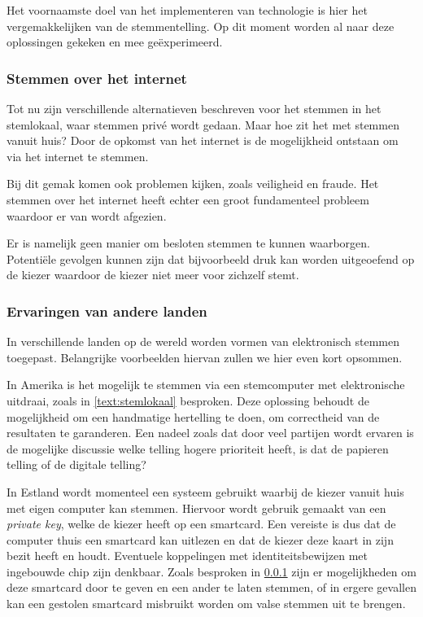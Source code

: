 \documentclass[a4paper]{article}
\begin{document}
Het voornaamste doel van het implementeren van technologie is hier het vergemakkelijken van de stemmentelling.
Op dit moment worden al naar deze oplossingen gekeken en mee ge{\"e}xperimeerd.

\subsubsection{Stemmen over het internet}
\label{text:internetstemmen}
Tot nu zijn verschillende alternatieven beschreven voor het stemmen in het stemlokaal, waar stemmen priv{\'e} wordt gedaan. 
Maar hoe zit het met stemmen vanuit huis?
Door de opkomst van het internet is de mogelijkheid ontstaan om via het internet te stemmen.

Bij dit gemak komen ook problemen kijken, zoals veiligheid en fraude. 
Het stemmen over het internet heeft echter een groot fundamenteel probleem waardoor er van wordt afgezien.

Er is namelijk geen manier om besloten stemmen te kunnen waarborgen.
Potenti{\"e}le gevolgen kunnen zijn dat bijvoorbeeld druk kan worden uitgeoefend op de kiezer waardoor de kiezer niet meer voor zichzelf stemt.

\subsubsection{Ervaringen van andere landen}
In verschillende landen op de wereld worden vormen van elektronisch stemmen toegepast.
Belangrijke voorbeelden hiervan zullen we hier even kort opsommen.

In Amerika is het mogelijk te stemmen via een stemcomputer met elektronische uitdraai, zoals in \ref{text:stemlokaal} besproken.
Deze oplossing behoudt de mogelijkheid om een handmatige hertelling te doen, om correctheid van de resultaten te garanderen.
Een nadeel zoals dat door veel partijen wordt ervaren is de mogelijke discussie welke telling hogere prioriteit heeft, is dat de papieren telling of de digitale telling? \cite{jacobs2009electronic}

In Estland wordt momenteel een systeem gebruikt waarbij de kiezer vanuit huis met eigen computer kan stemmen. \cite{jacobs2009electronic}
Hiervoor wordt gebruik gemaakt van een \emph{private key}, welke de kiezer heeft op een smartcard.
Een vereiste is dus dat de computer thuis een smartcard kan uitlezen en dat de kiezer deze kaart in zijn bezit heeft en houdt.
Eventuele koppelingen met identiteitsbewijzen met ingebouwde chip zijn denkbaar. 
Zoals besproken in \ref{text:internetstemmen} zijn er mogelijkheden om deze smartcard door te geven en een ander te laten stemmen, of in ergere gevallen kan een gestolen smartcard misbruikt worden om valse stemmen uit te brengen.
\end{document}

